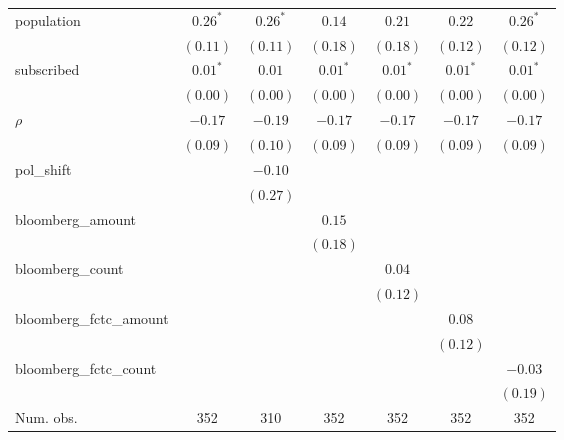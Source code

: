 \begin{table}[!h]
\begin{center}
\begin{tabular}{l c c c c c c }
population              & $0.26^{*}$   & $0.26^{*}$   & $0.14$       & $0.21$       & $0.22$       & $0.26^{*}$   \\
                        & $(0.11)$     & $(0.11)$     & $(0.18)$     & $(0.18)$     & $(0.12)$     & $(0.12)$     \\
subscribed              & $0.01^{*}$   & $0.01$       & $0.01^{*}$   & $0.01^{*}$   & $0.01^{*}$   & $0.01^{*}$   \\
                        & $(0.00)$     & $(0.00)$     & $(0.00)$     & $(0.00)$     & $(0.00)$     & $(0.00)$     \\
$\rho$                  & $-0.17$      & $-0.19$      & $-0.17$      & $-0.17$      & $-0.17$      & $-0.17$      \\
                        & $(0.09)$     & $(0.10)$     & $(0.09)$     & $(0.09)$     & $(0.09)$     & $(0.09)$     \\
pol\_shift              &              & $-0.10$      &              &              &              &              \\
                        &              & $(0.27)$     &              &              &              &              \\
bloomberg\_amount       &              &              & $0.15$       &              &              &              \\
                        &              &              & $(0.18)$     &              &              &              \\
bloomberg\_count        &              &              &              & $0.04$       &              &              \\
                        &              &              &              & $(0.12)$     &              &              \\
bloomberg\_fctc\_amount &              &              &              &              & $0.08$       &              \\
                        &              &              &              &              & $(0.12)$     &              \\
bloomberg\_fctc\_count  &              &              &              &              &              & $-0.03$      \\
                        &              &              &              &              &              & $(0.19)$     \\
\midrule
Num. obs.               & 352          & 310          & 352          & 352          & 352          & 352          \\

\end{tabular}
\end{center}
\end{table}
